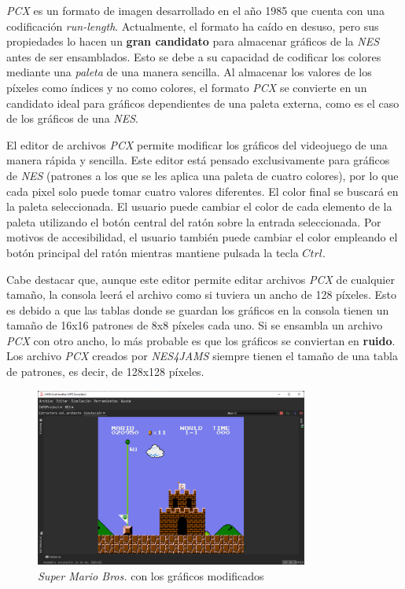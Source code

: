 \textit{PCX} es un formato de imagen desarrollado
en el año 1985 que cuenta con una codificación \textit{run-length}.
Actualmente, el formato ha caído en desuso, pero sus propiedades
lo hacen un \textbf{gran candidato} para almacenar gráficos
de la \textit{NES} antes de ser ensamblados.
Esto se debe a su capacidad de codificar los colores mediante
una \textit{paleta} de una manera sencilla.
Al almacenar los valores de los píxeles como índices y no
como colores, el formato \textit{PCX} se convierte en un
candidato ideal para gráficos dependientes de una paleta
externa, como es el caso de los gráficos de una \textit{NES}.

El editor de archivos \textit{PCX} permite modificar los
gráficos del videojuego de una manera rápida y sencilla.
Este editor está pensado exclusivamente para gráficos
de \textit{NES} (patrones a los que se les aplica una
paleta de cuatro colores), por lo que cada pixel solo puede tomar
cuatro valores diferentes.
El color final se buscará en la paleta seleccionada.
El usuario puede cambiar el color de cada elemento de la
paleta utilizando el botón central del ratón sobre
la entrada seleccionada.
Por motivos de accesibilidad, el usuario también puede
cambiar el color empleando el botón principal del
ratón mientras mantiene pulsada la tecla $Ctrl$.

Cabe destacar que, aunque este editor permite editar
archivos \textit{PCX} de cualquier tamaño, la consola
leerá el archivo como si tuviera un ancho de 128 píxeles.
Esto es debido a que las tablas donde se guardan los gráficos
en la consola tienen un tamaño de 16x16 patrones
de 8x8 píxeles cada uno.
Si se ensambla un archivo \textit{PCX} con otro ancho,
lo más probable es que los gráficos se conviertan en
\textbf{ruido}.
Los archivo \textit{PCX} creados por \textit{NES4JAMS}
siempre tienen el tamaño de una tabla de patrones,
es decir, de 128x128 píxeles.

\begin{figure}[h]
    \centering
    \includegraphics[width=0.8\textwidth]{images/nes/nes-graphics-change}
    \caption{\textit{Super Mario Bros.} con los gráficos modificados}
    \label{fig:nes-graphics-change}
\end{figure}

